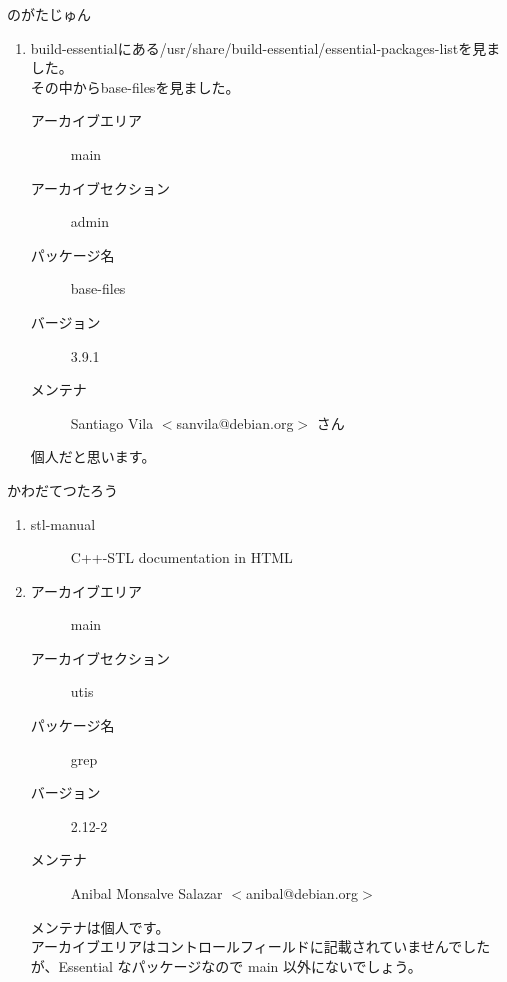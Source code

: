 \documentclass[mingoth,a4paper]{jsarticle}
\begin{document}
\begin{prework}{ のがたじゅん }
\begin{enumerate}
\begin{description}
    \end{description}
  \item build-essentialにある/usr/share/build-essential/essential-packages-listを見ました。\\
    その中からbase-filesを見ました。
    \begin{description}
    \item [アーカイブエリア] main
    \item [アーカイブセクション] admin
    \item [パッケージ名] base-files
    \item [バージョン] 3.9.1
    \item [メンテナ] Santiago Vila $<$sanvila@debian.org$>$ さん
    \end{description}
    個人だと思います。
  \end{enumerate}
\end{prework}

\begin{prework}{ かわだてつたろう }
  \begin{enumerate}
  \item
    \begin{description}
    \item [stl-manual] C++-STL documentation in HTML
    \end{description}
  \item 
    \begin{description}
    \item [アーカイブエリア] main
    \item [アーカイブセクション] utis 
    \item [パッケージ名] grep
    \item [バージョン] 2.12-2
    \item [メンテナ] Anibal Monsalve Salazar $<$anibal@debian.org$>$
    \end{description}
    メンテナは個人です。\\
    アーカイブエリアはコントロールフィールドに記載されていませんでしたが、Essential なパッケージなので main 以外にないでしょう。
  \end{enumerate}
\end{prework}
\end{document}
